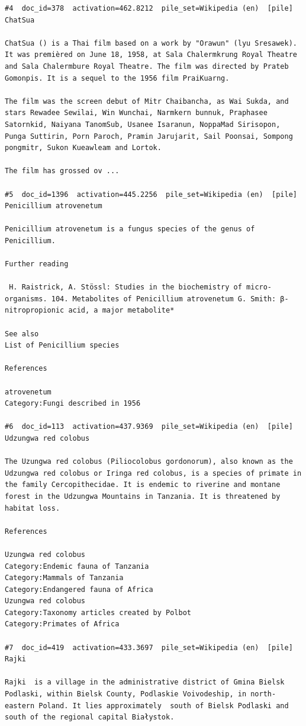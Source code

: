 \begin{verbatim}
#4  doc_id=378  activation=462.8212  pile_set=Wikipedia (en)  [pile]
ChatSua

ChatSua () is a Thai film based on a work by "Orawun" (lyu Sresawek). It was premièred on June 18, 1958, at Sala Chalermkrung Royal Theatre and Sala Chalermbure Royal Theatre. The film was directed by Prateb Gomonpis. It is a sequel to the 1956 film PraiKuarng.

The film was the screen debut of Mitr Chaibancha, as Wai Sukda, and stars Rewadee Sewilai, Win Wunchai, Narmkern bunnuk, Praphasee Satornkid, Naiyana TanomSub, Usanee Isaranun, NoppaMad Sirisopon, Punga Suttirin, Porn Paroch, Pramin Jarujarit, Sail Poonsai, Sompong pongmitr, Sukon Kueawleam and Lortok.

The film has grossed ov ...

#5  doc_id=1396  activation=445.2256  pile_set=Wikipedia (en)  [pile]
Penicillium atrovenetum

Penicillium atrovenetum is a fungus species of the genus of Penicillium.

Further reading

 H. Raistrick, A. Stössl: Studies in the biochemistry of micro-organisms. 104. Metabolites of Penicillium atrovenetum G. Smith: β-nitropropionic acid, a major metabolite*

See also
List of Penicillium species

References

atrovenetum
Category:Fungi described in 1956

#6  doc_id=113  activation=437.9369  pile_set=Wikipedia (en)  [pile]
Udzungwa red colobus

The Uzungwa red colobus (Piliocolobus gordonorum), also known as the Udzungwa red colobus or Iringa red colobus, is a species of primate in the family Cercopithecidae. It is endemic to riverine and montane forest in the Udzungwa Mountains in Tanzania. It is threatened by habitat loss.

References

Uzungwa red colobus
Category:Endemic fauna of Tanzania
Category:Mammals of Tanzania
Category:Endangered fauna of Africa
Uzungwa red colobus
Category:Taxonomy articles created by Polbot
Category:Primates of Africa

#7  doc_id=419  activation=433.3697  pile_set=Wikipedia (en)  [pile]
Rajki

Rajki  is a village in the administrative district of Gmina Bielsk Podlaski, within Bielsk County, Podlaskie Voivodeship, in north-eastern Poland. It lies approximately  south of Bielsk Podlaski and  south of the regional capital Białystok.


\end{verbatim}
